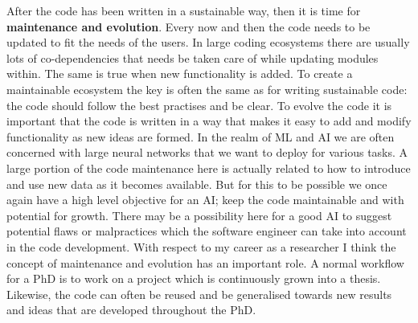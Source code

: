 \documentclass[11pt]{article}
\begin{document}
After the code has been written in a sustainable way, then it is time for \textbf{maintenance and evolution}. Every now and then the code needs to be updated to fit the needs of the users. In large coding ecosystems there are usually lots of co-dependencies that needs be taken care of while updating modules within. The same is true when new functionality is added. To create a maintainable ecosystem the key is often the same as for writing sustainable code: the code should follow the best practises and be clear. To evolve the code it is important that the code is written in a way that makes it easy to add and modify functionality as new ideas are formed. In the realm of ML and AI we are often concerned with large neural networks that we want to deploy for various tasks. A large portion of the code maintenance here is actually related to how to introduce and use new data as it becomes available. But for this to be possible we once again have a high level objective for an AI; keep the code maintainable and with potential for growth. There may be a possibility here for a good AI to suggest potential flaws or malpractices which the software engineer can take into account in the code development. With respect to my career as a researcher I think the concept of maintenance and evolution has an important role. A normal workflow for a PhD is to work on a project which is continuously grown into a thesis. Likewise, the code can often be reused and be generalised towards new results and ideas that are developed throughout the PhD. 
\end{document}
